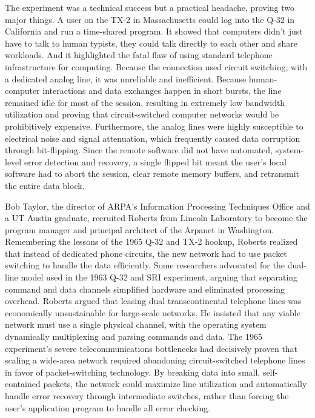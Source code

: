 The experiment was a technical success but a practical headache, proving two major things. A user on the TX-2 in Massachusetts could log into the Q-32 in California and run a time-shared program. It showed that computers didn't just have to talk to human typists, they could talk directly to each other and share workloads. And it highlighted the fatal flaw of using standard telephone infrastructure for computing. Because the connection used circuit switching, with a dedicated analog line, it was unreliable and inefficient. Because human-computer interactions and data exchanges happen in short bursts, the line remained idle for most of the session, resulting in extremely low bandwidth utilization and proving that circuit-switched computer networks would be prohibitively expensive. Furthermore, the analog lines were highly susceptible to electrical noise and signal attenuation, which frequently caused data corruption through bit-flipping. Since the remote software did not have automated, system-level error detection and recovery, a single flipped bit meant the user’s local software had to abort the session, clear remote memory buffers, and retransmit the entire data block.

Bob Taylor, the director of ARPA's Information Processing Techniques Office and a UT Austin graduate, recruited Roberts from Lincoln Laboratory to become the program manager and principal architect of the Arpanet in Washington. Remembering the lessons of the 1965 Q-32 and TX-2 hookup, Roberts realized that instead of dedicated phone circuits, the new network had to use packet switching to handle the data efficiently. Some researchers advocated for the dual-line model used in the 1963 Q-32 and SRI experiment, arguing that separating command and data channels simplified hardware and eliminated processing overhead. Roberts argued that leasing dual transcontinental telephone lines was economically unsustainable for large-scale networks. He insisted that any viable network must use a single physical channel, with the operating system dynamically multiplexing and parsing commands and data. The 1965 experiment's severe telecommunications bottlenecks had decisively proven that scaling a wide-area network required abandoning circuit-switched telephone lines in favor of packet-switching technology. By breaking data into small, self-contained packets, the network could maximize line utilization and automatically handle error recovery through intermediate switches, rather than forcing the user's application program to handle all error checking.

